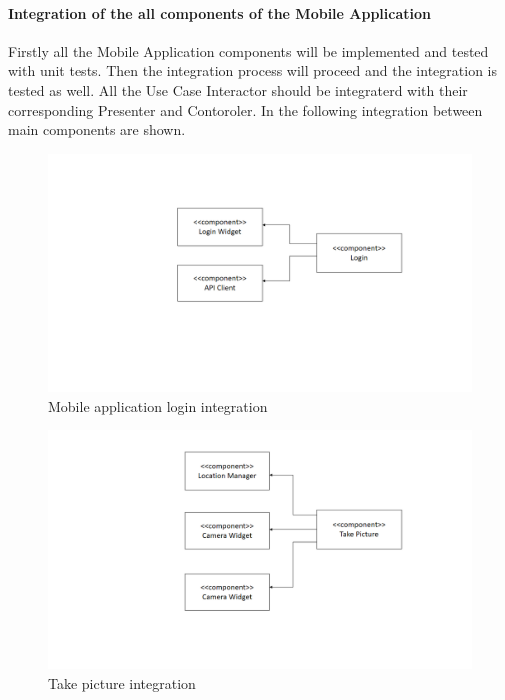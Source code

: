 \paragraph{Integration of the all components of the Mobile Application}
Firstly all the Mobile Application components will be implemented and tested with unit tests. Then the integration process will proceed and the integration is tested as well. All the Use Case Interactor should be integraterd with their corresponding Presenter and Contoroler. In the following integration between main components are shown.

\begin{figure}[H]
\centering
\includegraphics[width=\textwidth]{Images/LoginIntegration.png}
\caption{\label{fig:LoginIntegration}Mobile application login integration}
\end{figure}

\begin{figure}[H]
\centering
\includegraphics[width=\textwidth]{Images/TakePicIntegration.png}
\caption{\label{fig:TakePicIntegration}Take picture integration}
\end{figure}

